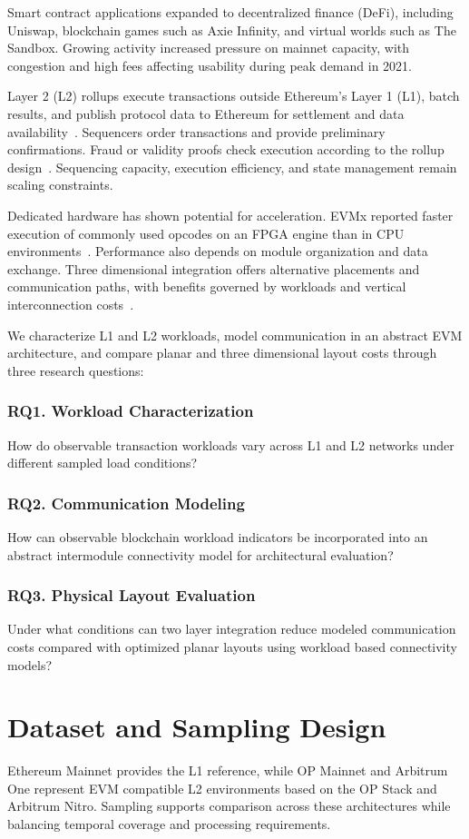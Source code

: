 \documentclass[runningheads]{llncs}
\begin{document}
Smart contract applications expanded to decentralized finance (DeFi), including Uniswap, blockchain games such as Axie Infinity, and virtual worlds such as The Sandbox. Growing activity increased pressure on mainnet capacity, with congestion and high fees affecting usability during peak demand in 2021.

Layer 2 (L2) rollups execute transactions outside Ethereum's Layer 1 (L1), batch results, and publish protocol data to Ethereum for settlement and data availability~\cite{rollups}. Sequencers order transactions and provide preliminary confirmations. Fraud or validity proofs check execution according to the rollup design~\cite{rollups,zkrollups}. Sequencing capacity, execution efficiency, and state management remain scaling constraints.

Dedicated hardware has shown potential for acceleration. EVMx reported faster execution of commonly used opcodes on an FPGA engine than in CPU environments~\cite{evmx}. Performance also depends on module organization and data exchange. Three dimensional integration offers alternative placements and communication paths, with benefits governed by workloads and vertical interconnection costs~\cite{xu2013,hsu2013}.

We characterize L1 and L2 workloads, model communication in an abstract EVM architecture, and compare planar and three dimensional layout costs through three research questions:
\subsubsection{RQ1. Workload Characterization}
How do observable transaction workloads vary across L1 and L2 networks under different sampled load conditions?
\subsubsection{RQ2. Communication Modeling}
How can observable blockchain workload indicators be incorporated into an abstract intermodule connectivity model for architectural evaluation?
\subsubsection{RQ3. Physical Layout Evaluation}
Under what conditions can two layer integration reduce modeled communication costs compared with optimized planar layouts using workload based connectivity models?

\section{Dataset and Sampling Design}
Ethereum Mainnet provides the L1 reference, while OP Mainnet and Arbitrum One represent EVM compatible L2 environments based on the OP Stack and Arbitrum Nitro. Sampling supports comparison across these architectures while balancing temporal coverage and processing requirements.
\end{document}
